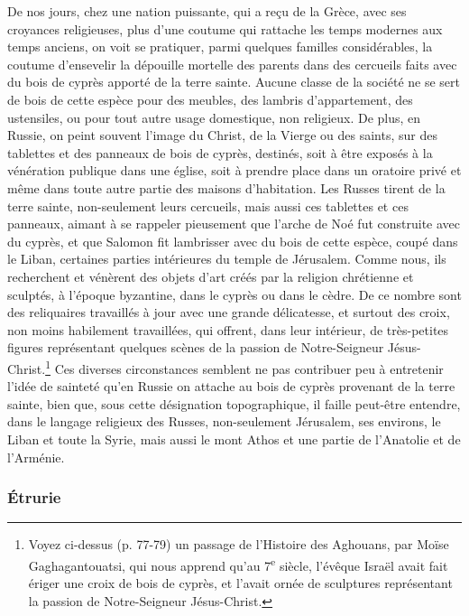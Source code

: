 \documentclass{article}
\begin{document}
De nos jours, chez une nation puissante, qui a reçu de la Grèce, avec ses croyances religieuses, plus d'une coutume qui rattache les temps modernes aux temps anciens, on voit se pratiquer, parmi quelques familles considérables, la coutume d'ensevelir la dépouille mortelle des parents dans des cercueils faits avec du bois de cyprès apporté de la terre sainte. Aucune classe de la société ne se sert de bois de cette espèce pour des meubles, des lambris d'appartement, des ustensiles, ou pour tout autre usage domestique, non religieux. De plus, en Russie, on peint souvent l'image du Christ, de la Vierge ou des saints, sur des tablettes et des panneaux de bois de cyprès, destinés, soit à être exposés à la vénération publique dans une église, soit à prendre place dans un oratoire privé et même dans toute autre partie des maisons d'habitation. Les Russes tirent de la terre sainte, non-seulement leurs cercueils, mais aussi ces tablettes et ces panneaux, aimant à se rappeler pieusement que l'arche de Noé fut construite avec du cyprès, et que Salomon fit lambrisser avec du bois de cette espèce, coupé dans le Liban, certaines parties intérieures du temple de Jérusalem. Comme nous, ils recherchent et vénèrent des objets d'art créés par la religion chrétienne et sculptés, à l'époque byzantine, dans le cyprès ou dans le cèdre. De ce nombre sont des reliquaires travaillés à jour avec une grande délicatesse, et surtout des croix, non moins habilement travaillées, qui offrent, dans leur intérieur, de très-petites figures représentant quelques scènes de la passion de Notre-Seigneur Jésus-Christ.\footnote{Voyez ci-dessus (p. 77-79) un passage de l'Histoire des Aghouans, par Moïse Gaghagantouatsi, qui nous apprend qu'au 7\textsuperscript{e} siècle, l'évêque Israël avait fait ériger une croix de bois de cyprès, et l'avait ornée de sculptures représentant la passion de Notre-Seigneur Jésus-Christ.} Ces diverses circonstances semblent ne pas contribuer peu à entretenir l'idée de sainteté qu'en Russie on attache au bois de cyprès provenant de la terre sainte, bien que, sous cette désignation topographique, il faille peut-être entendre, dans le langage religieux des Russes, non-seulement Jérusalem, ses environs, le Liban et toute la Syrie, mais aussi le mont Athos et une partie de l'Anatolie et de l'Arménie.

\subsubsection{Étrurie}
\end{document}
